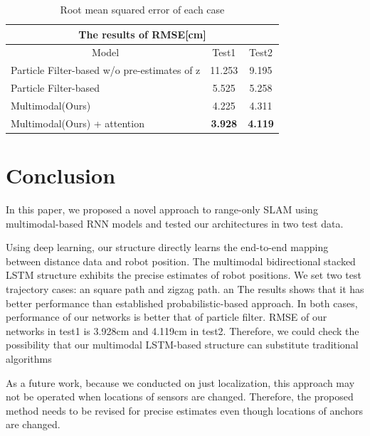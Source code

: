 \documentclass{ieeeaccess}
\begin{document}
\begin{table}[h]
	\begin{tabular}{lllcc}
		\hline
		\multicolumn{5}{c}{The results of RMSE{[}cm{]}}                                                                          \\ \hline
		\multicolumn{3}{c|}{Model}                                        & \multicolumn{1}{c|}{Test1}          & Test2          \\ \hline
		\multicolumn{3}{l|}{Particle Filter-based w/o pre-estimates of z} & \multicolumn{1}{c|}{11.253}         & 9.195          \\
		\multicolumn{3}{l|}{Particle Filter-based}                        & \multicolumn{1}{c|}{5.525}          & 5.258          \\
		\multicolumn{3}{l|}{Multimodal(Ours)}                                   & \multicolumn{1}{c|}{4.225}          & 4.311          \\
		\multicolumn{3}{l|}{Multimodal(Ours) + attention}                       & \multicolumn{1}{c|}{\textbf{3.928}} & \textbf{4.119}
	\end{tabular}
	\caption{Root mean squared error of each case}
	\label{table:RMSE_table}
\end{table}



\section{Conclusion}

In this paper, we proposed a novel approach to range-only SLAM using multimodal-based RNN models and tested our architectures in two test data.

Using deep learning, our structure directly learns the end-to-end mapping between distance data and robot position. The multimodal bidirectional stacked LSTM structure exhibits the precise estimates of robot positions. We set two test trajectory cases: an square path and zigzag path. an The results shows that it has better performance than established probabilistic-based approach. In both cases, performance of our networks  is better that of particle filter. RMSE of our networks in test1 is 3.928cm and 4.119cm in test2. Therefore, we could check the possibility that our multimodal LSTM-based structure can substitute traditional algorithms

As a future work, because we conducted on just localization, this approach may not be operated when locations of sensors are changed. Therefore, the proposed method needs to be revised for precise estimates even though locations of anchors are changed. 
\end{document}
